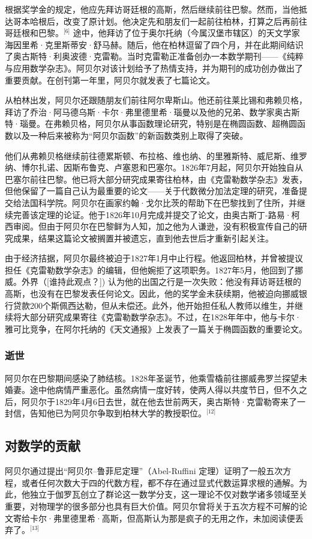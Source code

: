 根据奖学金的规定，他应先拜访哥廷根的高斯，然后继续前往巴黎。然而，当他抵达哥本哈根后，改变了原计划。他决定先和朋友们一起前往柏林，打算之后再前往哥廷根和巴黎。\(^\text{[6]}\)
途中，他拜访了位于奥尔托纳（今属汉堡市辖区）的天文学家海因里希·克里斯蒂安·舒马赫。随后，他在柏林逗留了四个月，并在此期间结识了奥古斯特·利奥波德·克雷勒。当时克雷勒正准备创办一本数学期刊——《纯粹与应用数学杂志》。阿贝尔对该计划给予了热情支持，并为期刊的成功创办做出了重要贡献。在创刊第一年里，阿贝尔就发表了七篇论文。

从柏林出发，阿贝尔还跟随朋友们前往阿尔卑斯山。他还前往莱比锡和弗赖贝格，拜访了乔治·阿马德乌斯·卡尔·弗里德里希·瑙曼以及他的兄弟、数学家奥古斯特·瑙曼。在弗赖贝格，阿贝尔从事函数理论研究，特别是在椭圆函数、超椭圆函数以及一种后来被称为“阿贝尔函数”的新函数类别上取得了突破。

他们从弗赖贝格继续前往德累斯顿、布拉格、维也纳、的里雅斯特、威尼斯、维罗纳、博尔扎诺、因斯布鲁克、卢塞恩和巴塞尔。1826年7月起，阿贝尔开始独自从巴塞尔前往巴黎。他已将大部分研究成果寄往柏林，由《克雷勒数学杂志》发表，但他保留了一篇自己认为最重要的论文——关于代数微分加法定理的研究，准备提交给法国科学院。阿贝尔在画家约翰·戈尔比茨的帮助下在巴黎找到了住所，并继续完善该定理的论证。他于1826年10月完成并提交了论文，由奥古斯丁-路易·柯西审阅。但由于阿贝尔在巴黎鲜为人知，加之他为人谦逊，没有积极宣传自己的研究成果，结果这篇论文被搁置并被遗忘，直到他去世后才重新引起关注。

由于经济拮据，阿贝尔最终被迫于1827年1月中止行程。他返回柏林，并曾被提议担任《克雷勒数学杂志》的编辑，但他婉拒了这项职务。1827年5月，他回到了挪威。外界（[谁持此观点？]) 认为他的出国之行是一次失败：他没有拜访哥廷根的高斯，也没有在巴黎发表任何论文。因此，他的奖学金未获续期，他被迫向挪威银行贷款200个斯佩西达勒，但从未偿还。此外，他开始担任私人教师以维生，并继续将大部分研究成果寄往《克雷勒数学杂志》。不过，在1828年年中，他与卡尔·雅可比竞争，在阿尔托纳的《天文通报》上发表了一篇关于椭圆函数的重要论文。
\subsubsection{逝世}
阿贝尔在巴黎期间感染了肺结核。1828年圣诞节，他乘雪橇前往挪威弗罗兰探望未婚妻。途中他病情严重恶化。虽然病情一度好转，使两人得以共度节日，但不久之后，阿贝尔于1829年4月6日去世，就在他去世前两天，奥古斯特·克雷勒寄来了一封信，告知他已为阿贝尔争取到柏林大学的教授职位。\(^\text{[12]}\)
\subsection{对数学的贡献}
阿贝尔通过提出“阿贝尔–鲁菲尼定理”（Abel-Ruffini 定理）证明了一般五次方程，或者任何次数大于四的代数方程，都不存在通过显式代数运算求根的通解。为此，他独立于伽罗瓦创立了群论这一数学分支，这一理论不仅对数学诸多领域至关重要，对物理学的很多部分也具有巨大价值。阿贝尔曾将关于五次方程不可解的论文寄给卡尔·弗里德里希·高斯，但高斯认为那是疯子的无用之作，未加阅读便丢弃了。\(^\text{[13]}\)

